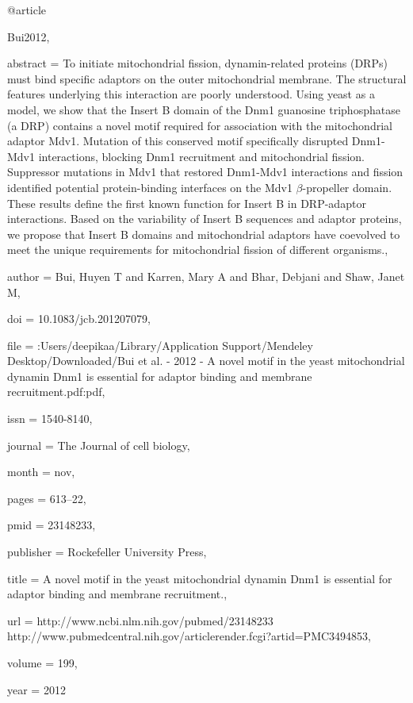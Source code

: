 @article{Bui2012,

abstract = {To initiate mitochondrial fission, dynamin-related proteins (DRPs) must bind specific adaptors on the outer mitochondrial membrane. The structural features underlying this interaction are poorly understood. Using yeast as a model, we show that the Insert B domain of the Dnm1 guanosine triphosphatase (a DRP) contains a novel motif required for association with the mitochondrial adaptor Mdv1. Mutation of this conserved motif specifically disrupted Dnm1-Mdv1 interactions, blocking Dnm1 recruitment and mitochondrial fission. Suppressor mutations in Mdv1 that restored Dnm1-Mdv1 interactions and fission identified potential protein-binding interfaces on the Mdv1 $\beta$-propeller domain. These results define the first known function for Insert B in DRP-adaptor interactions. Based on the variability of Insert B sequences and adaptor proteins, we propose that Insert B domains and mitochondrial adaptors have coevolved to meet the unique requirements for mitochondrial fission of different organisms.},

author = {Bui, Huyen T and Karren, Mary A and Bhar, Debjani and Shaw, Janet M},

doi = {10.1083/jcb.201207079},

file = {:Users/deepikaa/Library/Application Support/Mendeley Desktop/Downloaded/Bui et al. - 2012 - A novel motif in the yeast mitochondrial dynamin Dnm1 is essential for adaptor binding and membrane recruitment.pdf:pdf},

issn = {1540-8140},

journal = {The Journal of cell biology},

month = {nov},

pages = {613--22},

pmid = {23148233},

publisher = {Rockefeller University Press},

title = {{A novel motif in the yeast mitochondrial dynamin Dnm1 is essential for adaptor binding and membrane recruitment.}},

url = {http://www.ncbi.nlm.nih.gov/pubmed/23148233 http://www.pubmedcentral.nih.gov/articlerender.fcgi?artid=PMC3494853},

volume = {199},

year = {2012}

}

